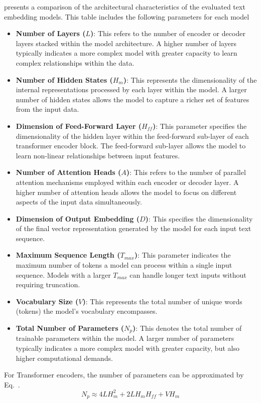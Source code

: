  presents a comparison of the architectural characteristics of the evaluated text embedding models.
This table includes the following parameters for each model

\begin{itemize}
    \item \textbf{Number of Layers ($L$)}:
        This refers to the number of encoder or decoder layers stacked within the model architecture.
        A higher number of layers typically indicates a more complex model with greater capacity to learn complex relationships within the data.
    \item \textbf{Number of Hidden States ($H_m$)}:
        This represents the dimensionality of the internal representations processed by each layer within the model.
        A larger number of hidden states allows the model to capture a richer set of features from the input data.
    \item \textbf{Dimension of Feed-Forward Layer ($H_{ff}$)}:
        This parameter specifies the dimensionality of the hidden layer within the feed-forward sub-layer of each transformer encoder block.
        The feed-forward sub-layer allows the model to learn non-linear relationships between input features.
    \item \textbf{Number of Attention Heads ($A$)}:
        This refers to the number of parallel attention mechanisms employed within each encoder or decoder layer.
        A higher number of attention heads allows the model to focus on different aspects of the input data simultaneously.
    \item \textbf{Dimension of Output Embedding ($D$)}:
        This specifies the dimensionality of the final vector representation generated by the model for each input text sequence.
    \item \textbf{Maximum Sequence Length ($T_{max}$)}:
        This parameter indicates the maximum number of tokens a model can process within a single input sequence.
        Models with a larger $T_{max}$ can handle longer text inputs without requiring truncation.
    \item \textbf{Vocabulary Size ($V$)}:
        This represents the total number of unique words (tokens) the model's vocabulary encompasses.
    \item \textbf{Total Number of Parameters ($N_p$)}:
        This denotes the total number of trainable parameters within the model.
        A larger number of parameters typically indicates a more complex model with greater capacity, but also higher computational demands.
\end{itemize}


For Transformer encoders, the number of parameters can be approximated by Eq.~.
\begin{equation}
    \label{eq:model_params}
    N_p \approx 4LH_m^2 + 2LH_m H_{ff} + VH_m
\end{equation}


